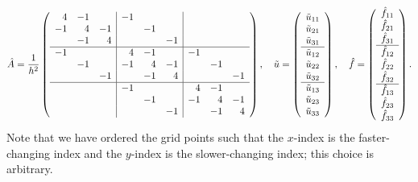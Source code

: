 \[\hat{A} = \frac{1}{h^2}\left(\begin{array}{rrr|rrr|rrr}
    4 & -1 & & -1 & & & & & \\
    -1 & 4 & -1 & & -1 & & & & \\
    & -1 & 4 & & & -1 & & & \\ \hline
    -1 & & & 4 & -1 & & -1 & & \\
    & -1 & & -1 & 4 & -1 & & -1 & \\
    & & -1 & & -1 & 4 & & & -1 \\ \hline
    & & & -1 & & & 4 & -1 & \\
    & & & & -1 & & -1 & 4 & -1 \\
    & & & & & -1 & & -1 & 4
\end{array}\right), \quad
\tilde{u} = \left(\begin{array}{c} \tilde{u}_{11} \\ \tilde{u}_{21} \\ \tilde{u}_{31} \\ \hline \tilde{u}_{12} \\ \tilde{u}_{22} \\ \tilde{u}_{32} \\ \hline \tilde{u}_{13} \\ \tilde{u}_{23} \\ \tilde{u}_{33} \end{array}\right), \quad
\hat{f} = \left(\begin{array}{c} \hat{f}_{11} \\ \hat{f}_{21} \\ \hat{f}_{31} \\ \hline \hat{f}_{12} \\ \hat{f}_{22} \\ \hat{f}_{32} \\ \hline \hat{f}_{13} \\ \hat{f}_{23} \\ \hat{f}_{33} \end{array}\right).\]
Note that we have ordered the grid points such that the $x$-index is the faster-changing index and the $y$-index is the slower-changing index; this choice is arbitrary.

